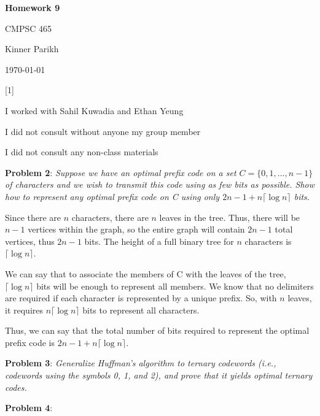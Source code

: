 \documentclass{article} %
\newcommand{\question}[2][]{\begin{flushleft}
        \textbf{Problem #1}: \textit{#2}

\end{flushleft}}
\newcommand{\maketitletwo}[2][]{\begin{center}
        \Large{\textbf{Homework #1}
            
            CMPSC 465} %
        \vspace{5pt}
        
        \normalsize{Kinner Parikh  %
        
        \today}        %
        \vspace{40pt}


        \newpage
        
\end{center}}
\begin{document}
    \maketitletwo[9]  %

    \question[1]{}
    \begin{center}
        
        I worked with Sahil Kuwadia and Ethan Yeung
    
        I did not consult without anyone my group member
    
        I did not consult any non-class materials
    \end{center}
    
    \newpage

    \question[2]{Suppose we have an optimal prefix code on a set $C = \{0,1,...,n-1\}$ of characters and we wish to transmit this code using as few bits as possible. Show how to represent any optimal prefix code on C using only $2n-1 + n\lceil \log n \rceil$ bits.}

    Since there are $n$ characters, there are $n$ leaves in the tree. Thus, there will be $n-1$ vertices within the graph, so the entire graph will contain $2n-1$ total vertices, thus $2n-1$ bits. The height of a full binary tree for $n$ characters is $\lceil \log n \rceil$. 

    We can say that to associate the members of C with the leaves of the tree, $\lceil \log n \rceil$ bits will be enough to represent all members. We know that no delimiters are required if each character is represented by a unique prefix. So, with $n$ leaves, it requires $n \lceil \log n \rceil$ bits to represent all characters.
    
    Thus, we can say that the total number of bits required to represent the optimal prefix code is $2n-1 + n\lceil \log n \rceil$.

    \newpage

    \question[3]{Generalize Huffman's algorithm to ternary codewords (i.e., codewords using the symbols 0, 1, and 2), and prove that it yields optimal ternary codes.}


    \newpage

    \question[4]{}
\end{document}
